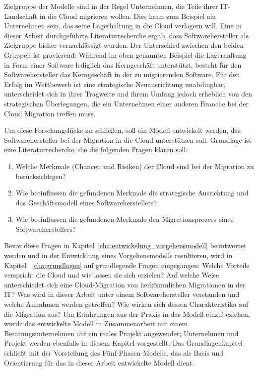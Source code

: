 Zielgruppe der Modelle sind in der Regel Unternehmen, die Teile ihrer 
IT-Landschaft in die Cloud migrieren wollen. Dies kann zum Beispiel ein 
Unternehmen sein, das 
seine Lagerhaltung in die Cloud verlagern will. Eine in 
dieser Arbeit durchgeführte Literaturrecherche ergab, 
dass Softwarehersteller als Zielgruppe bisher vernachlässigt wurden. Der 
Unterschied zwischen den beiden Gruppen ist gravierend: Während im oben 
genannten Beispiel die 
Lagerhaltung in Form einer Software lediglich das Kerngeschäft unterstützt, 
besteht für den Softwarehersteller das Kerngeschäft in der zu migrierenden 
Software. Für den Erfolg im Wettbewerb ist eine strategische 
Neuausrichtung 
unabdingbar, unterscheidet sich in ihrer Tragweite und ihrem Umfang jedoch 
erheblich von den strategischen Überlegungen, die ein Unternehmen einer anderen 
Branche bei der Cloud Migration treffen muss. 

Um diese Forschungslücke zu schließen, soll ein Modell entwickelt werden, das 
Softwarehersteller bei der Migration in die Cloud unterstützen soll. Grundlage 
ist eine Literaturrecherche, die die folgenden Fragen klären soll:
\begin{enumerate}
	\item Welche Merkmale (Chancen und Risiken) der Cloud sind bei der 
Migration zu berücksichtigen?
	\item Wie beeinflussen die gefundenen Merkmale die strategische 
Ausrichtung und das Geschäftsmodell eines Softwareherstellers?
	\item Wie beeinflussen die gefundenen Merkmale den Migrationsprozess 
eines Softwareherstellers?
\end{enumerate}

Bevor diese Fragen in Kapitel~\ref{cha:entwickelung_vorgehensmodell}  
beantwortet werden und in der Entwicklung eines Vorgehensmodells resultieren, 
wird in Kapitel ~\ref{cha:grundlagen} auf grundlegende Fragen eingegangen: 
Welche Vorteile verspricht die Cloud und wie lassen sie sich erzielen? Auf 
welche Weise unterschiedet sich eine Cloud-Migration von herkömmlichen 
Migrationen in der IT? Was wird in dieser Arbeit unter einem Softwarehersteller 
verstanden und welche Annahmen werden getroffen? Wie wirken sich dessen 
Charakteristika auf die Migration aus?
Um Erfahrungen aus der Praxis in das 
Modell einzubeziehen, wurde das entwickelte Modell in Zusammenarbeit mit einem 
Beratungsunternehmen auf ein reales Projekt angewendet; Unternehmen und Projekt 
werden ebenfalls in diesem Kapitel vorgestellt.
Das Grundlagenkapitel schließt mit der Vorstellung des Fünf-Phasen-Modells, das 
als Basis und Orientierung für das in dieser Arbeit entwickelte Modell dient.

